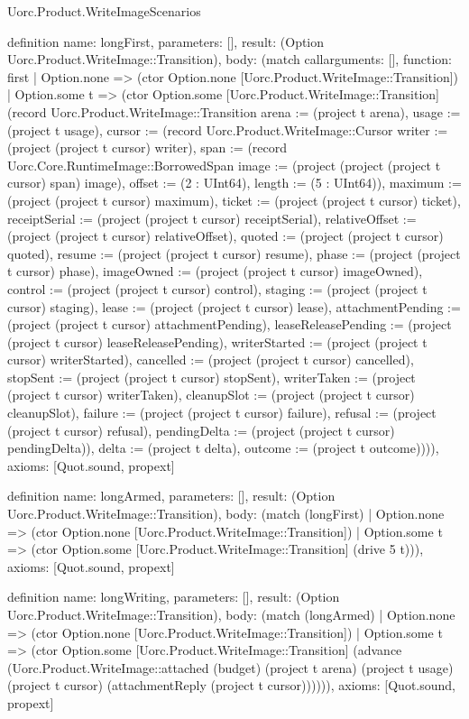 \begin{lexlean}{Uorc.Product.WriteImageScenarios}
\begin{semanticmodule}
definition{
  name: longFirst,
  parameters: [],
  result: (Option Uorc.Product.WriteImage::Transition),
  body: (match call{arguments: [], function: first}
    | Option.none => (ctor Option.none [Uorc.Product.WriteImage::Transition])
    | Option.some t => (ctor Option.some [Uorc.Product.WriteImage::Transition] (record Uorc.Product.WriteImage::Transition {arena := (project t arena), usage := (project t usage), cursor := (record Uorc.Product.WriteImage::Cursor {writer := (project (project t cursor) writer), span := (record Uorc.Core.RuntimeImage::BorrowedSpan {image := (project (project (project t cursor) span) image), offset := (2 : UInt64), length := (5 : UInt64)}), maximum := (project (project t cursor) maximum), ticket := (project (project t cursor) ticket), receiptSerial := (project (project t cursor) receiptSerial), relativeOffset := (project (project t cursor) relativeOffset), quoted := (project (project t cursor) quoted), resume := (project (project t cursor) resume), phase := (project (project t cursor) phase), imageOwned := (project (project t cursor) imageOwned), control := (project (project t cursor) control), staging := (project (project t cursor) staging), lease := (project (project t cursor) lease), attachmentPending := (project (project t cursor) attachmentPending), leaseReleasePending := (project (project t cursor) leaseReleasePending), writerStarted := (project (project t cursor) writerStarted), cancelled := (project (project t cursor) cancelled), stopSent := (project (project t cursor) stopSent), writerTaken := (project (project t cursor) writerTaken), cleanupSlot := (project (project t cursor) cleanupSlot), failure := (project (project t cursor) failure), refusal := (project (project t cursor) refusal), pendingDelta := (project (project t cursor) pendingDelta)}), delta := (project t delta), outcome := (project t outcome)}))),
  axioms: [Quot.sound, propext]
}

definition{
  name: longArmed,
  parameters: [],
  result: (Option Uorc.Product.WriteImage::Transition),
  body: (match (longFirst)
    | Option.none => (ctor Option.none [Uorc.Product.WriteImage::Transition])
    | Option.some t => (ctor Option.some [Uorc.Product.WriteImage::Transition] (drive 5 t))),
  axioms: [Quot.sound, propext]
}

definition{
  name: longWriting,
  parameters: [],
  result: (Option Uorc.Product.WriteImage::Transition),
  body: (match (longArmed)
    | Option.none => (ctor Option.none [Uorc.Product.WriteImage::Transition])
    | Option.some t => (ctor Option.some [Uorc.Product.WriteImage::Transition] (advance (Uorc.Product.WriteImage::attached (budget) (project t arena) (project t usage) (project t cursor) (attachmentReply (project t cursor)))))),
  axioms: [Quot.sound, propext]
}


\end{semanticmodule}
\end{lexlean}

